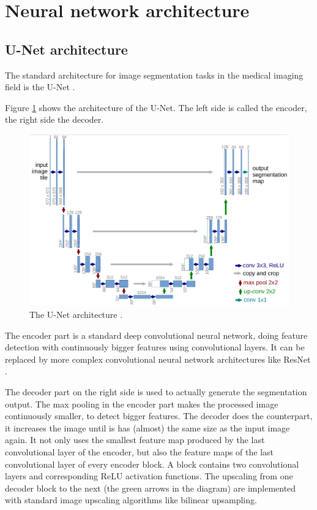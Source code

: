 \section{Neural network architecture}
\subsection{U-Net architecture}
The standard architecture for image segmentation tasks in the medical imaging field is the U-Net \cite{ronneberger2015u}.

Figure \ref{unet} shows the architecture of the U-Net. The left side is called the encoder, the right side the decoder.

\begin{figure}[H]
\centering
\includegraphics[width=14cm]{images/unet.png}
\caption{The U-Net architecture \cite{ronneberger2015u}.}
\label{unet}
\end{figure}

The encoder part is a standard deep convolutional neural network, doing feature detection with continuously bigger features using convolutional layers.
It can be replaced by more complex convolutional neural network architectures like ResNet \cite{he2016deep}.

The decoder part on the right side is used to actually generate the segmentation output. The max pooling in the encoder part makes the processed image continuously smaller,
to detect bigger features. The decoder does the counterpart, it increases the image until is has (almost) the same size as the input image again. It not only uses
the smallest feature map produced by the last convolutional layer of the encoder, but also the feature maps of the last convolutional layer of every encoder block.
A block contains two convolutional layers and corresponding ReLU activation functions. The upscaling from one decoder block to the next (the green arrows in the diagram) are
implemented with standard image upscaling algorithms like bilinear upsampling.


